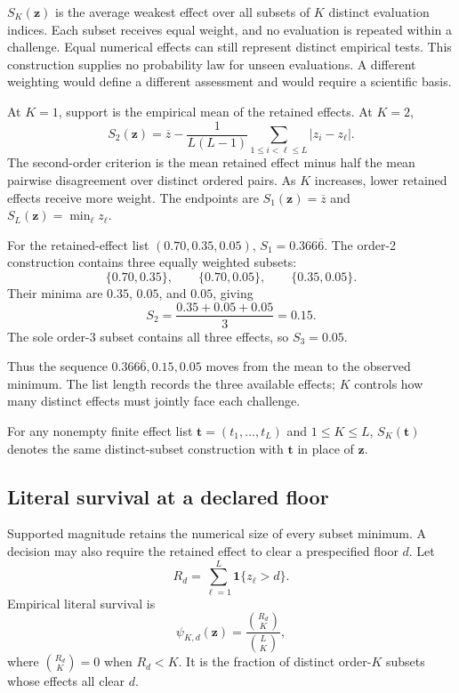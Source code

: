 \documentclass[11pt]{article}
\theoremstyle{remark}
\begin{document}
$S_K(\mathbf z)$ is the average weakest effect over all subsets of $K$
distinct evaluation indices. Each subset receives equal weight, and no
evaluation is repeated within a challenge. Equal numerical effects can still
represent distinct empirical tests. This construction supplies no probability
law for unseen evaluations. A different weighting would define a different
assessment and would require a scientific basis.

At $K=1$, support is the empirical mean of the retained effects. At $K=2$,
\begin{equation}
S_2(\mathbf z)
=
\overline z
-
\frac{1}{L(L-1)}
\sum_{1\leq i<\ell\leq L}|z_i-z_\ell|.
\label{eq:k2}
\end{equation}
The second-order criterion is the mean retained effect minus half the mean
pairwise disagreement over distinct ordered pairs. As $K$ increases, lower
retained effects receive more weight. The endpoints are
$S_1(\mathbf z)=\overline z$ and $S_L(\mathbf z)=\min_\ell z_\ell$.

\begin{samepage}
\noindent For the retained-effect list $(0.70,0.35,0.05)$,
$S_1=0.366\overline{6}$. The order-2 construction contains three equally
weighted subsets:
\[
\{0.70,0.35\},\qquad
\{0.70,0.05\},\qquad
\{0.35,0.05\}.
\]
Their minima are $0.35$, $0.05$, and $0.05$, giving
\[
S_2
=
\frac{0.35+0.05+0.05}{3}
=0.15.
\]
The sole order-3 subset contains all three effects, so $S_3=0.05$.
\end{samepage}
Thus the sequence $0.366\overline{6},0.15,0.05$ moves from the mean to
the observed minimum. The list length records the three available effects;
$K$ controls how many distinct effects must jointly face each challenge.

For any nonempty finite effect list $\mathbf t=(t_1,\ldots,t_L)$ and
$1\leq K\leq L$, $S_K(\mathbf t)$ denotes the same distinct-subset
construction with $\mathbf t$ in place of $\mathbf z$.

\subsection{Literal survival at a declared floor}

Supported magnitude retains the numerical size of every subset minimum. A
decision may also require the retained effect to clear a prespecified floor
$d$. Let
\[
R_d
=
\sum_{\ell=1}^L\mathbf 1\{z_\ell>d\}.
\]
Empirical literal survival is
\begin{equation}
\psi_{K,d}(\mathbf z)
=
\frac{\binom{R_d}{K}}{\binom{L}{K}},
\label{eq:literal-survival-main}
\end{equation}
where $\binom{R_d}{K}=0$ when $R_d<K$. It is the fraction of distinct
order-$K$ subsets whose effects all clear $d$.
\end{document}
